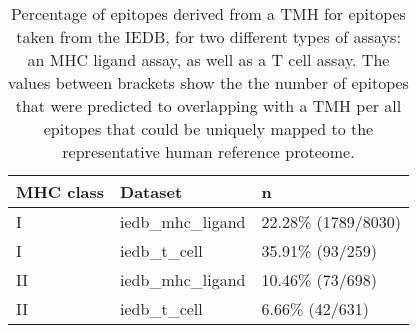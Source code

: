 \begin{table}[ht]
\centering
\begin{tabular}{lll}
  \hline
MHC class & Dataset & n \\ 
  \hline
I & iedb\_mhc\_ligand & 22.28\% (1789/8030) \\ 
  I & iedb\_t\_cell & 35.91\% (93/259) \\ 
  II & iedb\_mhc\_ligand & 10.46\% (73/698) \\ 
  II & iedb\_t\_cell &  6.66\% (42/631) \\ 
   \hline
\end{tabular}
\caption{Percentage of epitopes derived from a TMH for epitopes taken from the IEDB, for two different types of assays:  an MHC ligand assay, as well as a T cell assay.  The values between brackets show the the number of epitopes that were predicted to overlapping with a TMH per all epitopes that could be uniquely mapped to the representative human reference proteome.} 
\label{tab:elution}
\end{table}
